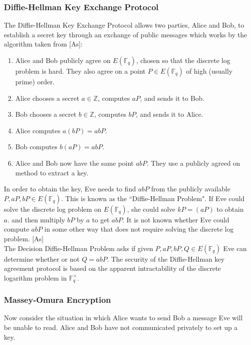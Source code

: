 \documentclass[12pt]{article}
\newcommand{\F}{\mathbb{F}}
\newcommand{\Z}{\mathbb{Z}}
\begin{document}
\subsubsection{Diffie-Hellman Key Exchange Protocol}

The Diffie-Hellman Key Exchange Protocol allows two parties, Alice and Bob, to establish a secret key through an exchange of public messages which works by the algorithm taken from [As]: 

\begin{enumerate}
\item Alice and Bob publicly agree on $E(\F_q)$, chosen so that the discrete log problem is hard. They also agree on a point $P \in E(\F_q)$ of high (usually prime) order.
\item Alice chooses a secret $a \in \Z$, computes $aP$, and sends it to Bob. 
\item Bob chooses a secret $b \in \Z$, computes $bP$, and sends it to Alice.
\item Alice computes $a(bP) = abP$.
\item Bob computes $b(aP) = abP$.
\item Alice and Bob now have the same point $abP$. They use a publicly agreed on method to extract a key. 
\end{enumerate}

In order to obtain the key, Eve needs to find $abP$ from the publicly available $P,aP,bP \in E(\F_q)$. This is known as the ``Diffie-Hellman Problem". If Eve could solve the discrete log problem on $E(\F_q)$, she could solve $kP = (aP)$ to obtain $a$. and then multiply $bP$ by $a$ to get $abP$. It is not known whether Eve could compute $abP$ in some other way that does not require solving the discrete log problem. [As] \\

The Decision Diffie-Hellman Problem asks if given $P,aP,bP,Q \in E(\F_q)$ Eve can determine whether or not $Q = abP$. The security of the Diffie-Hellman key agreement protocol is based on the apparent intractability of the discrete logarithm problem in $\F_q^{\times}.$

\subsubsection{Massey-Omura Encryption}

Now consider the situation in which Alice wants to send Bob a message Eve will be unable to read. Alice and Bob have not communicated privately to set up a key.\\
\end{document}
